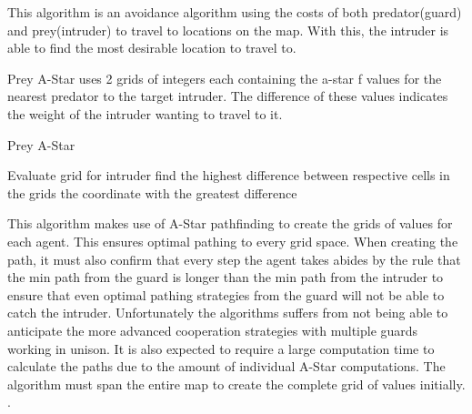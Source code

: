 This algorithm is an avoidance algorithm using the costs of both predator(guard) and prey(intruder) to travel to locations on the map. With this, the intruder is able to find the most desirable location to travel to.

    Prey A-Star uses 2 grids of integers each containing the a-star f values for the nearest predator to the target intruder. The difference of these values indicates the weight of the intruder wanting to travel to it.
    
    \begin{algorithm}
    \label{preyAAlgorithm}
    \caption{Prey A-Star}
        Evaluate grid for intruder\;
        find the highest difference between respective cells in the grids\; 
        \Return the coordinate with the greatest difference\;
     \end{algorithm}   
    
    This algorithm makes use of A-Star pathfinding to create the grids of values for each agent. This ensures optimal pathing to every grid space. When creating the path, it must also confirm that every step the agent takes abides by the rule that the min path from the guard is longer than the min path from the intruder to ensure that even optimal pathing strategies from the guard will not be able to catch the intruder. 
    Unfortunately the algorithms suffers from not being able to anticipate the more advanced cooperation strategies with multiple guards working in unison. It is also expected to require a large computation time to calculate the paths due to the amount of individual A-Star computations. The algorithm must span the entire map to create the complete grid of values initially. \cite{undeger2010multi, undeger2007single, undeger2009real}.

